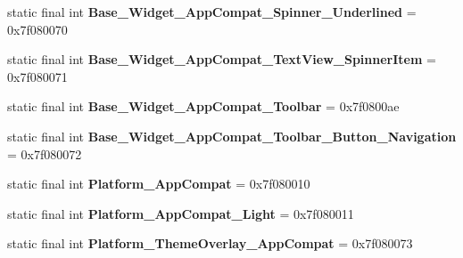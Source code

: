 \begin{DoxyCompactItemize}
\item 
\hypertarget{classandroid_1_1support_1_1v7_1_1appcompat_1_1_r_1_1style_a320d36af9a1b161f8d8bceb2add804af}{}static final int {\bfseries Base\+\_\+\+Widget\+\_\+\+App\+Compat\+\_\+\+Spinner\+\_\+\+Underlined} = 0x7f080070\label{classandroid_1_1support_1_1v7_1_1appcompat_1_1_r_1_1style_a320d36af9a1b161f8d8bceb2add804af}

\item 
\hypertarget{classandroid_1_1support_1_1v7_1_1appcompat_1_1_r_1_1style_a2b2ea8aed9a7cfd0340087f3b14f273f}{}static final int {\bfseries Base\+\_\+\+Widget\+\_\+\+App\+Compat\+\_\+\+Text\+View\+\_\+\+Spinner\+Item} = 0x7f080071\label{classandroid_1_1support_1_1v7_1_1appcompat_1_1_r_1_1style_a2b2ea8aed9a7cfd0340087f3b14f273f}

\item 
\hypertarget{classandroid_1_1support_1_1v7_1_1appcompat_1_1_r_1_1style_ab2a5b30c6563b433f6b30f720c9febdb}{}static final int {\bfseries Base\+\_\+\+Widget\+\_\+\+App\+Compat\+\_\+\+Toolbar} = 0x7f0800ae\label{classandroid_1_1support_1_1v7_1_1appcompat_1_1_r_1_1style_ab2a5b30c6563b433f6b30f720c9febdb}

\item 
\hypertarget{classandroid_1_1support_1_1v7_1_1appcompat_1_1_r_1_1style_ad89e1f45e5f45327367aaeb165887dda}{}static final int {\bfseries Base\+\_\+\+Widget\+\_\+\+App\+Compat\+\_\+\+Toolbar\+\_\+\+Button\+\_\+\+Navigation} = 0x7f080072\label{classandroid_1_1support_1_1v7_1_1appcompat_1_1_r_1_1style_ad89e1f45e5f45327367aaeb165887dda}

\item 
\hypertarget{classandroid_1_1support_1_1v7_1_1appcompat_1_1_r_1_1style_a384c9f78df3b7c85d4456ea70e0f1a6b}{}static final int {\bfseries Platform\+\_\+\+App\+Compat} = 0x7f080010\label{classandroid_1_1support_1_1v7_1_1appcompat_1_1_r_1_1style_a384c9f78df3b7c85d4456ea70e0f1a6b}

\item 
\hypertarget{classandroid_1_1support_1_1v7_1_1appcompat_1_1_r_1_1style_aec8d69dfc75b377e70dab4450522249f}{}static final int {\bfseries Platform\+\_\+\+App\+Compat\+\_\+\+Light} = 0x7f080011\label{classandroid_1_1support_1_1v7_1_1appcompat_1_1_r_1_1style_aec8d69dfc75b377e70dab4450522249f}

\item 
\hypertarget{classandroid_1_1support_1_1v7_1_1appcompat_1_1_r_1_1style_ad1eaa7488679a38de1c1d644df0440b0}{}static final int {\bfseries Platform\+\_\+\+Theme\+Overlay\+\_\+\+App\+Compat} = 0x7f080073\label{classandroid_1_1support_1_1v7_1_1appcompat_1_1_r_1_1style_ad1eaa7488679a38de1c1d644df0440b0}


\end{DoxyCompactItemize}
